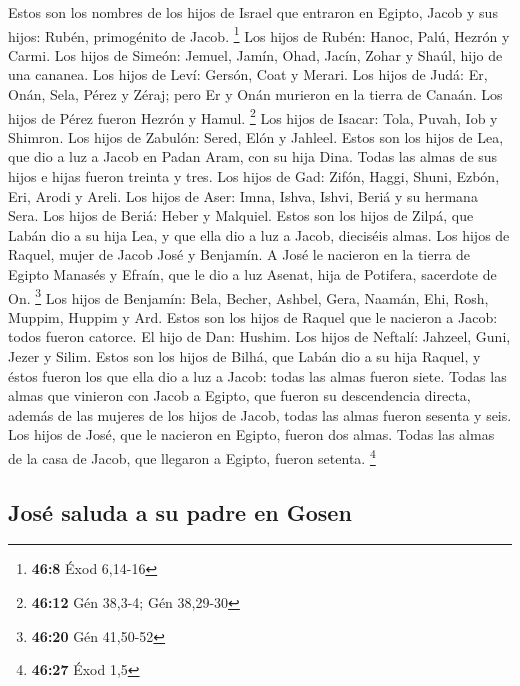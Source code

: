\begin{paracol}{2}
 Estos son los nombres de los hijos de Israel que entraron
en Egipto, Jacob y sus hijos: Rubén, primogénito de Jacob. \footnote{\textbf{46:8}
  Éxod 6,14-16}  Los hijos de Rubén: Hanoc, Palú, Hezrón y
Carmi.  Los hijos de Simeón: Jemuel, Jamín, Ohad, Jacín,
Zohar y Shaúl, hijo de una cananea.  Los hijos de Leví:
Gersón, Coat y Merari.  Los hijos de Judá: Er, Onán,
Sela, Pérez y Zéraj; pero Er y Onán murieron en la tierra de Canaán. Los
hijos de Pérez fueron Hezrón y Hamul. \footnote{\textbf{46:12} Gén
  38,3-4; Gén 38,29-30}  Los hijos de Isacar: Tola,
Puvah, Iob y Shimron.  Los hijos de Zabulón: Sered, Elón
y Jahleel.  Estos son los hijos de Lea, que dio a luz a
Jacob en Padan Aram, con su hija Dina. Todas las almas de sus hijos e
hijas fueron treinta y tres.  Los hijos de Gad: Zifón,
Haggi, Shuni, Ezbón, Eri, Arodi y Areli.  Los hijos de
Aser: Imna, Ishva, Ishvi, Beriá y su hermana Sera. Los hijos de Beriá:
Heber y Malquiel.  Estos son los hijos de Zilpá, que
Labán dio a su hija Lea, y que ella dio a luz a Jacob, dieciséis almas.
 Los hijos de Raquel, mujer de Jacob José y Benjamín.
 A José le nacieron en la tierra de Egipto Manasés y
Efraín, que le dio a luz Asenat, hija de Potifera, sacerdote de On.
\footnote{\textbf{46:20} Gén 41,50-52}  Los hijos de
Benjamín: Bela, Becher, Ashbel, Gera, Naamán, Ehi, Rosh, Muppim, Huppim
y Ard.  Estos son los hijos de Raquel que le nacieron a
Jacob: todos fueron catorce.  El hijo de Dan: Hushim.
 Los hijos de Neftalí: Jahzeel, Guni, Jezer y Silim.
 Estos son los hijos de Bilhá, que Labán dio a su hija
Raquel, y éstos fueron los que ella dio a luz a Jacob: todas las almas
fueron siete.  Todas las almas que vinieron con Jacob a
Egipto, que fueron su descendencia directa, además de las mujeres de los
hijos de Jacob, todas las almas fueron sesenta y seis. 
Los hijos de José, que le nacieron en Egipto, fueron dos almas. Todas
las almas de la casa de Jacob, que llegaron a Egipto, fueron setenta.
\footnote{\textbf{46:27} Éxod 1,5}

\hypertarget{josuxe9-saluda-a-su-padre-en-gosen}{%
\subsection{José saluda a su padre en
Gosen}\label{josuxe9-saluda-a-su-padre-en-gosen}}


\end{paracol}
